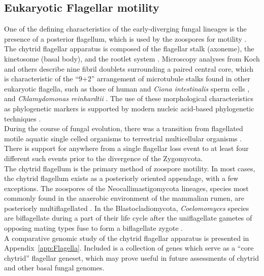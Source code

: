 \subsection*{Eukaryotic Flagellar motility}
One of the defining characteristics of the early-diverging fungal
lineages is the presence of a posterior flagellum, which is used by
the zoospores for motility \cite{Koch1958motileI}. The chytrid flagellar
apparatus is composed of the flagellar stalk (axoneme), the kinetosome
(basal body), and the rootlet system \cite{Barr1981}. Microscopy analyses from Koch 
and others \cite{Koch1958motileI} describe nine fibril doublets surrounding a paired central core, which is characteristic of the
\enquote{9+2} arrangement of microtubule stalks found in other eukaryotic flagella, such 
as those of human and \textit{Ciona intestinalis} sperm cells \cite{Inaba2003}, 
and \textit{Chlamydomonas reinhardtii} \cite{Silflow2001}. The use of these morphological 
characteristics as phylogenetic markers is supported by modern nucleic 
acid-based phylogenetic techniques \cite{James2000}.\\
\indent During the course of fungal evolution, there was a transition from flagellated motile aquatic single celled organisms to terrestrial multicellular organisms \cite{Taylor2006,Stajich2009}. There is support for anywhere from a single flagellar loss event \cite{Liu2006} to at least four different such events \cite{James2006sixGene} prior to the divergence of the Zygomycota.\\
\indent The chytrid flagellum is the primary method of zoospore motility. In most cases, the chytrid flagellum exists as a posteriorly oriented appendage, with a few exceptions. The zoospores of the Neocallimastigomycota lineages, species most commonly found in the anaerobic environment of the mammalian rumen, are posteriorly multiflagellated \cite{Ho1995}. In the Blastocladiomycota, \textit{Coelomomyces} species are biflagellate during a part of their life cycle after the uniflagellate gametes of opposing mating types fuse to form a biflagellate zygote \cite{Padua1986}.\\ 
\indent A comparative genomic study of the chytrid flagellar apparatus is presented in Appendix~\ref{app:Flagella}. Included is a collection of genes which serve as a \enquote{core chytrid} flagellar geneset, which may prove useful in future assessments of chytrid and other basal fungal genomes.\\
